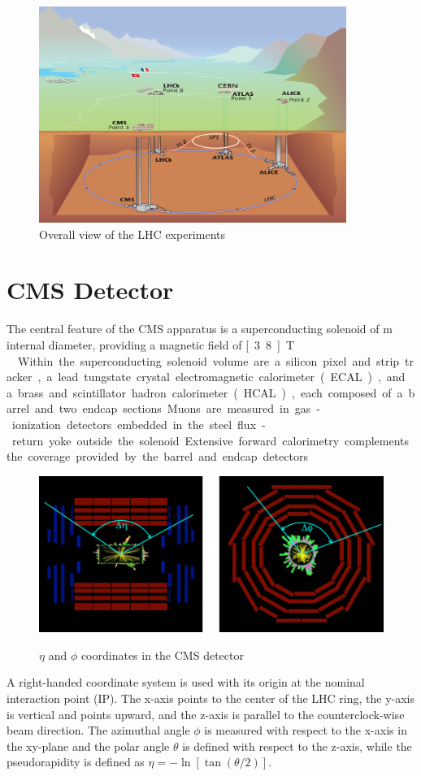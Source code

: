 \begin{figure}[H]
  \centering
\includegraphics[width=10cm]{CMS_chapter_plots/lhc}
  \caption{Overall view of the LHC experiments \label{fig:LHC}}
\end{figure}
\noindent


\section{CMS Detector}

The central feature of the CMS apparatus is a superconducting solenoid of \unit[6]{m} internal diameter, providing a magnetic field of \unit[3.8]{T}.\\
\indent
Within the superconducting solenoid volume are a silicon pixel and strip tracker, a lead tungstate crystal electromagnetic calorimeter (ECAL), and a brass and scintillator hadron calorimeter (HCAL), each composed of a barrel and two endcap sections. Muons are measured in gas-ionization detectors embedded in the steel flux-return yoke outside the solenoid. Extensive forward calorimetry complements the coverage provided by the barrel and endcap detectors.\\

\begin{figure}[H]
  \centering
\includegraphics[width=12cm]{CMS_chapter_plots/image_eta}
\label{eta}\caption{$\eta$ and $\phi$ coordinates in the CMS detector}
\end{figure}
\noindent
\indent
A right-handed coordinate system is used with its origin at the nominal interaction point (IP). The x-axis points to the center of
the LHC ring, the y-axis is vertical and points upward, and the z-axis is parallel to the counterclock-wise beam direction. The azimuthal angle $\phi$ is measured with respect to the x-axis in the xy-plane and the polar angle $\theta$ is defined with respect to the z-axis, while the pseudorapidity is defined as $\eta = -\ln\left[\tan\left(\theta/2 \right)  \right]$. 

